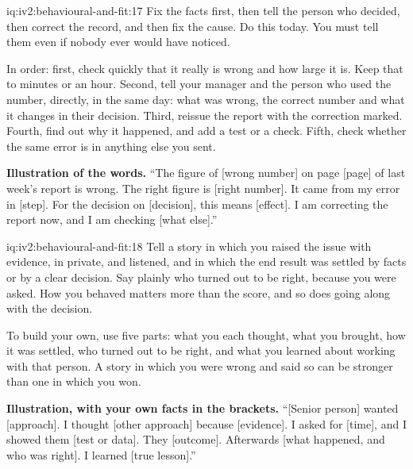 \begin{solution}{iq:iv2:behavioural-and-fit:17}
Fix the facts first, then tell the person who decided, then correct the record, and then fix the cause. Do this today. You must tell them even if nobody ever would have noticed.

In order: first, check quickly that it really is wrong and how large it is. Keep that to minutes or an hour. Second, tell your manager and the person who used the number, directly, in the same day: what was wrong, the correct number and what it changes in their decision. Third, reissue the report with the correction marked. Fourth, find out why it happened, and add a test or a check. Fifth, check whether the same error is in anything else you sent.

\textbf{Illustration of the words.} ``The figure of [wrong number] on page [page] of last week's report is wrong. The right figure is [right number]. It came from my error in [step]. For the decision on [decision], this means [effect]. I am correcting the report now, and I am checking [what else].''

\end{solution}

\begin{solution}{iq:iv2:behavioural-and-fit:18}
Tell a story in which you raised the issue with evidence, in private, and listened, and in which the end result was settled by facts or by a clear decision. Say plainly who turned out to be right, because you were asked. How you behaved matters more than the score, and so does going along with the decision.

To build your own, use five parts: what you each thought, what you brought, how it was settled, who turned out to be right, and what you learned about working with that person. A story in which you were wrong and said so can be stronger than one in which you won.

\textbf{Illustration, with your own facts in the brackets.} ``[Senior person] wanted [approach]. I thought [other approach] because [evidence]. I asked for [time], and I showed them [test or data]. They [outcome]. Afterwards [what happened, and who was right]. I learned [true lesson].''

\end{solution}

